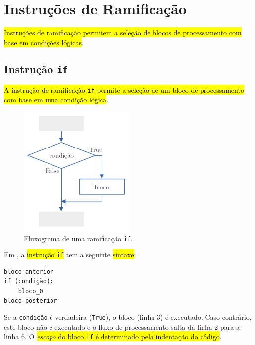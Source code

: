 \section{Instruções de Ramificação}\label{cap_progest_sec_ramifica}

\hl{Instruções de ramificação permitem a seleção de blocos de processamento com base em condições lógicas}.

\subsection{Instrução \texttt{if}}

\hl{A instrução de ramificação \texttt{if} permite a seleção de um bloco de processamento com base em uma condição lógica}.

\begin{figure}[H]
  \centering
  \includegraphics[width=0.5\textwidth]{./cap_progest/dados/fig_fg_if/fig}
  \caption{Fluxograma de uma ramificação \lstinline+if+.}
  \label{cap_progest_sec_ramifica:fig:fg_if}
\end{figure}

Em {\python}, a \hl{instrução \texttt{if}} tem a seguinte \hl{sintaxe}:

\begin{lstlisting}
bloco_anterior
if (condição):
    bloco_0
bloco_posterior
\end{lstlisting}

Se a {\lstinline+condição+} é verdadeira ({\lstinline+True+}), o bloco (linha 3) é executado. Caso contrário, este bloco não é executado e o fluxo de processamento salta da linha 2 para a linha 6. O \hl{\emph{escopo} do bloco \texttt{if} é determinado pela indentação do código}.

